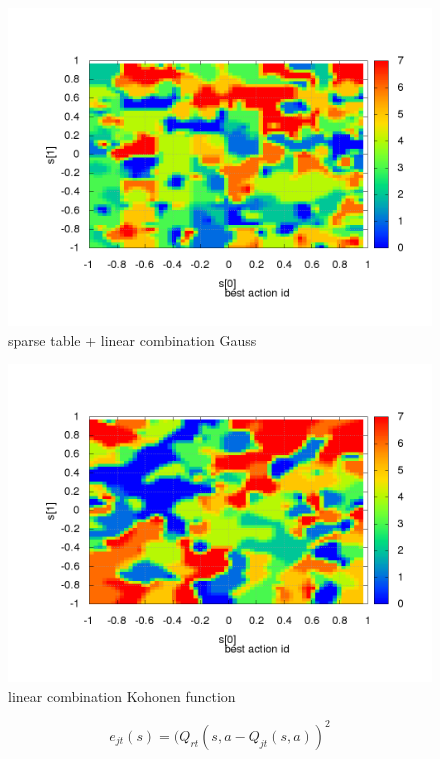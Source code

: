 \begin{figure}[!htb]
\includegraphics[scale=.4]{../../results_q_learning/map_1/function_type_3/iterations_10/action_best_value_log_surface.png}
\caption{sparse table + linear combination Gauss}
\end{figure}


\begin{figure}[!htb]
\includegraphics[scale=.4]{../../results_q_learning/map_1/function_type_4/iterations_10/action_best_value_log_surface.png}
\caption{linear combination Kohonen function}
\end{figure}




\begin{equation}
e_{jt}(s) = (Q_{rt}(s,a - Q_{jt}(s,a))^2  \nonumber
\end{equation}


